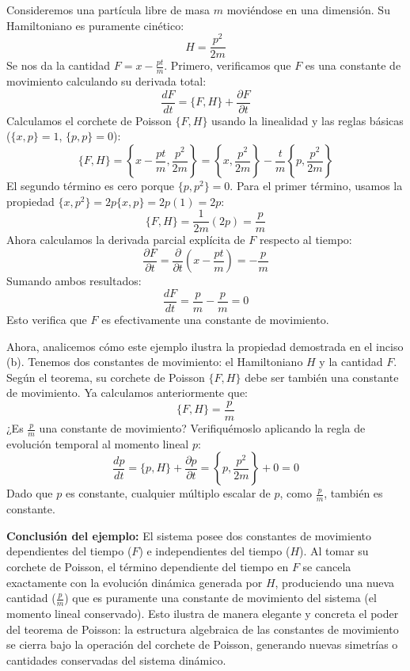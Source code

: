 \documentclass[a4paper]{article}
\begin{document}
Consideremos una partícula libre de masa $m$ moviéndose en una dimensión. Su Hamiltoniano es puramente cinético:
$$H = \frac{p^2}{2m}$$
Se nos da la cantidad $F = x - \frac{pt}{m}$. Primero, verificamos que $F$ es una constante de movimiento calculando su derivada total:
$$\frac{dF}{dt} = \{F, H\} + \frac{\partial F}{\partial t}$$
Calculamos el corchete de Poisson $\{F, H\}$ usando la linealidad y las reglas básicas ($\{x, p\} = 1$, $\{p, p\} = 0$):
$$\{F, H\} = \left\{x - \frac{pt}{m}, \frac{p^2}{2m}\right\} = \left\{x, \frac{p^2}{2m}\right\} - \frac{t}{m}\left\{p, \frac{p^2}{2m}\right\}$$
El segundo término es cero porque $\{p, p^2\} = 0$. Para el primer término, usamos la propiedad $\{x, p^2\} = 2p\{x, p\} = 2p(1) = 2p$:
$$\{F, H\} = \frac{1}{2m}(2p) = \frac{p}{m}$$
Ahora calculamos la derivada parcial explícita de $F$ respecto al tiempo:
$$\frac{\partial F}{\partial t} = \frac{\partial}{\partial t}\left(x - \frac{pt}{m}\right) = -\frac{p}{m}$$
Sumando ambos resultados:
$$\frac{dF}{dt} = \frac{p}{m} - \frac{p}{m} = 0$$
Esto verifica que $F$ es efectivamente una constante de movimiento.

Ahora, analicemos cómo este ejemplo ilustra la propiedad demostrada en el inciso (b). Tenemos dos constantes de movimiento: el Hamiltoniano $H$ y la cantidad $F$. Según el teorema, su corchete de Poisson $\{F, H\}$ debe ser también una constante de movimiento.
Ya calculamos anteriormente que:
$$\{F, H\} = \frac{p}{m}$$
¿Es $\frac{p}{m}$ una constante de movimiento? Verifiquémoslo aplicando la regla de evolución temporal al momento lineal $p$:
$$\frac{dp}{dt} = \{p, H\} + \frac{\partial p}{\partial t} = \left\{p, \frac{p^2}{2m}\right\} + 0 = 0$$
Dado que $p$ es constante, cualquier múltiplo escalar de $p$, como $\frac{p}{m}$, también es constante. 

\textbf{Conclusión del ejemplo:} El sistema posee dos constantes de movimiento dependientes del tiempo ($F$) e independientes del tiempo ($H$). Al tomar su corchete de Poisson, el término dependiente del tiempo en $F$ se cancela exactamente con la evolución dinámica generada por $H$, produciendo una nueva cantidad ($\frac{p}{m}$) que es puramente una constante de movimiento del sistema (el momento lineal conservado). Esto ilustra de manera elegante y concreta el poder del teorema de Poisson: la estructura algebraica de las constantes de movimiento se cierra bajo la operación del corchete de Poisson, generando nuevas simetrías o cantidades conservadas del sistema dinámico.


 
\end{document}
